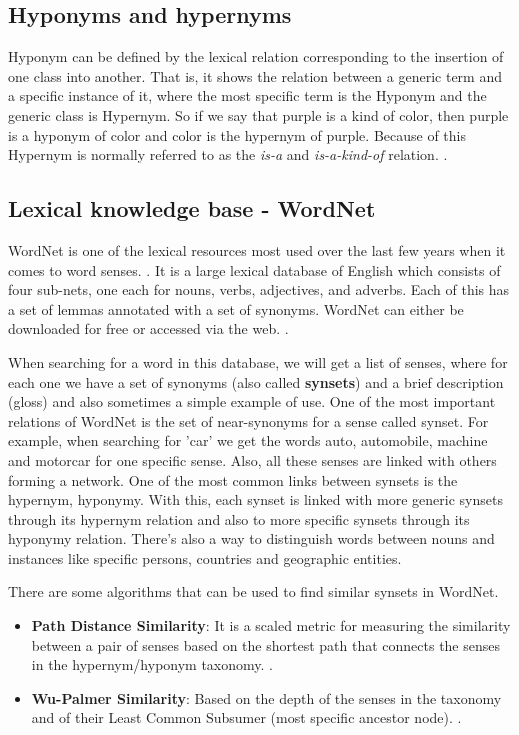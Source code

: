 \subsection{Hyponyms and hypernyms}

Hyponym can be defined by the lexical relation corresponding to the insertion of one class into another. That is, it shows the relation between a generic term and a specific instance of it, where the most specific term is the Hyponym and the generic class is Hypernym. So if we say that purple is a kind of color, then purple is a hyponym of color and color is the hypernym of purple. Because of this Hypernym is normally referred to as the \textit{is-a} and \textit{is-a-kind-of} relation. \cite[p.~88]{cruse1986lexical}.

\subsection{Lexical knowledge base - WordNet}

WordNet is one of the lexical resources most used over the last few years when it comes to word senses. \cite{fellbaum1998}. It is a large lexical database of English which consists of four sub-nets, one each for nouns, verbs, adjectives, and adverbs. Each of this has a set of lemmas annotated with a set of synonyms. WordNet can either be downloaded for free or accessed via the web. \cite{wordnetOnline2010}.

When searching for a word in this database, we will get a list of senses, where for each one we have a set of synonyms (also called \textbf{synsets}) and a brief description (gloss) and also sometimes a simple example of use. One of the most important relations of WordNet is the set of near-synonyms for a sense called synset. For example, when searching for 'car' we get the words auto, automobile, machine and motorcar for one specific sense. Also, all these senses are linked with others forming a network. One of the most common links between synsets is the hypernym, hyponymy. With this, each synset is linked with more generic synsets through its hypernym relation and also to more specific synsets through its hyponymy relation. There's also a way to distinguish words between nouns and instances like specific persons, countries and geographic entities.

There are some algorithms that can be used to find similar synsets in WordNet.

\begin{itemize}
    \item \textbf{Path Distance Similarity}: It is a scaled metric for measuring the similarity between a pair of senses based on the shortest path that connects the senses in the hypernym/hyponym taxonomy. \cite{meng2014measuring}.
    \item \textbf{Wu-Palmer Similarity}: Based on the depth of the senses in the taxonomy and of their Least Common Subsumer (most specific ancestor node). \cite{meng2014measuring}.
\end{itemize}

